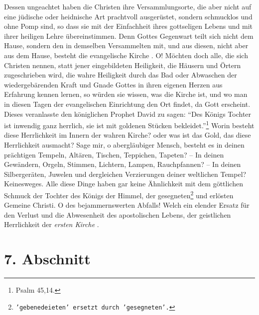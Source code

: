 \medskip

Dessen ungeachtet haben die Christen ihre Versammlungsorte, die aber nicht auf
eine jüdische oder heidnische Art prachtvoll ausgerüstet, sondern schmucklos und
ohne Pomp sind, so dass sie mit der Einfachheit ihres gottseligen Lebens und mit
ihrer heiligen Lehre übereinstimmen. Denn Gottes Gegenwart  teilt sich nicht dem
Hause, sondern den in demselben Versammelten mit, und aus diesen, nicht aber aus
dem Hause, besteht die evangelische Kirche 
. O! Möchten doch alle, die sich
Christen nennen, statt jener eingebildeten Heiligkeit, die Häusern und Örtern
zugeschrieben wird, die wahre Heiligkeit durch das Bad oder Abwaschen der
wiedergebärenden Kraft und Gnade Gottes in ihren eigenen Herzen aus Erfahrung
kennen lernen, so würden sie wissen, was die Kirche ist, und wo man in diesen
Tagen der evangelischen Einrichtung den Ort findet, da Gott erscheint. Dieses
veranlasste den königlichen Prophet David  zu sagen:
"`Des Königs Tochter ist inwendig ganz herrlich, sie ist mit goldenen Stücken
bekleidet."'\footnote{Psalm 45,14.}
Worin besteht diese Herrlichkeit im Innern der wahren Kirche? oder was
ist das Gold, das diese Herrlichkeit ausmacht? Sage mir, o abergläubiger Mensch,
besteht es in deinen prächtigen Tempeln, Altären, Tischen,
Teppichen, Tapeten?
-- In deinen Gewändern, Orgeln, Stimmen, Lichtern, Lampen,
Rauchpfannen? -- In
deinen Silbergeräten, Juwelen und dergleichen Verzierungen deiner weltlichen
Tempel? Keinesweges. Alle diese Dinge haben gar keine
Ähnlichkeit mit dem
göttlichen Schmuck der Tochter des Königs der Himmel, der
gesegneten\footnote{\texttt{'gebenedeieten' ersetzt durch 'gesegneten'.}}
und
erlösten Gemeine Christi. O des bejammernswerten Abfalls! Welch ein elender
Ersatz für den Verlust und die Abwesenheit des apostolischen Lebens, der
geistlichen Herrlichkeit der \textit{ersten Kirche} .

\section{7. Abschnitt} \label{kap5_ab7}

